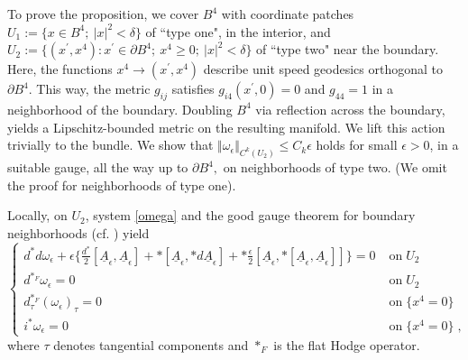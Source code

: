 \documentclass[11pt]{article}
\numberwithin{equation}{section} \setlength{\topmargin}{-35pt}
\begin{document}
To prove the proposition, we cover $B^4$ with coordinate patches
$U_1:=\{x\in B^4;\ \vert x\vert^2 <\delta\}$ of ``type one", in the
interior, and $U_2:=\{(x^\prime, x^4): x^\prime\in\partial B^4;\
x^4\geq 0;\ \vert x\vert^2< \delta\}$ of ``type two" near the
boundary. Here, the functions $x^4\to(x^\prime, x^4)$ describe unit
speed geodesics orthogonal to $\partial B^4.$ This way, the metric
$g_{ij}$ satisfies $g_{i4}(x^\prime,0)=0$ and $g_{44}= 1$ in a
neighborhood of the boundary. Doubling $B^4$ via reflection across
the boundary, yields a Lipschitz-bounded metric on the resulting
manifold. We lift this action trivially to the bundle. We show that
$\Vert \omega_\epsilon\Vert_{C^k(U_2)}\leq C_k\epsilon$ holds for
small $\epsilon>0$, in a suitable gauge, all the way up to $\partial
B^4,$ on neighborhoods of type two. (We omit the proof for
neighborhoods of type one).

Locally, on $U_2$, system \eqref{omega} and the good gauge theorem
for boundary neighborhoods (cf. \cite{Marini}) yield
\begin{equation}
\label{omegaloc} \left \{
\begin{array}{ll}
d^*d \omega_\epsilon +\epsilon\{ \frac{d^*}{2}[{\underline
A}_\epsilon, {\underline  A}_\epsilon]+* [{\underline  A}_\epsilon,
*d {\underline  A}_\epsilon] +*\frac {\epsilon}
{2}[{\underline  A}_\epsilon,* [{\underline  A}_\epsilon,
{\underline  A}_\epsilon]]\}  =0 & \;\text{on}\;U_2\\
d^{*_F} \omega_\epsilon =0 & \;\text{on}\;U_2\\
d^{*_F}_\tau (\omega_\epsilon)_\tau =0 & \;\text{on}\;\{x^4=0\}\\
i^*\omega_\epsilon= 0& \;\text{on}\;\{x^4=0\}\;,
\end{array}
\right .
\end{equation}
where $\tau$ denotes tangential components and $*_F$ is the flat
Hodge operator.
\end{document}
